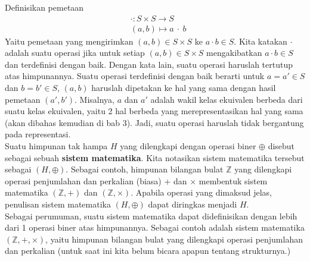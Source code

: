 	Definisikan pemetaan
	\begin{equation*}
		\begin{split}
			& \cdot: S \times S \rightarrow S\\
			& (a,b) \mapsto a \ \cdot \ b
		\end{split}
	\end{equation*}
	Yaitu pemetaan yang mengirimkan $(a,b) \in S \times S$ ke $a \cdot b \in S$. Kita katakan $\cdot$ adalah suatu operasi jika untuk setiap $(a,b) \in S \times S$ mengakibatkan $a\cdot  b \in S$ dan terdefinisi dengan baik. Dengan kata lain, suatu operasi haruslah tertutup atas himpunannya. Suatu operasi terdefinisi dengan baik berarti untuk $a = a' \in S$ dan $b = b' \in S$, $(a,b)$ haruslah dipetakan ke hal yang sama dengan hasil pemetaan $(a',b')$. Misalnya, $a$ dan $a'$ adalah wakil kelas ekuivalen berbeda dari suatu kelas ekuivalen, yaitu 2 hal berbeda yang merepresentasikan hal yang sama (akan dibahas kemudian di bab 3). Jadi, suatu operasi haruslah tidak bergantung pada representasi.
	\\
	
	Suatu himpunan tak hampa $H$ yang dilengkapi dengan operasi biner $\oplus$ disebut sebagai sebuah \textbf{sistem matematika}. Kita notasikan sistem matematika tersebut sebagai $(H, \oplus)$. Sebagai contoh, himpunan bilangan bulat $\mathbb{Z}$ yang dilengkapi operasi penjumlahan  dan perkalian (biasa) + dan $\times$ membentuk sistem matematika $(\mathbb{Z}, +)$ dan $(\mathbb{Z}, \times)$. Apabila operasi yang dimaksud jelas, penulisan sistem matematika $(H, \oplus)$ dapat diringkas menjadi $H$.
	\\
	
	Sebagai perumuman, suatu sistem matematika dapat didefinisikan dengan lebih dari 1 operasi biner atas himpunannya. Sebagai contoh adalah sistem matematika $(\mathbb{Z},+,\times)$, yaitu himpunan bilangan bulat yang dilengkapi operasi penjumlahan dan perkalian (untuk saat ini kita belum bicara apapun tentang strukturnya.)